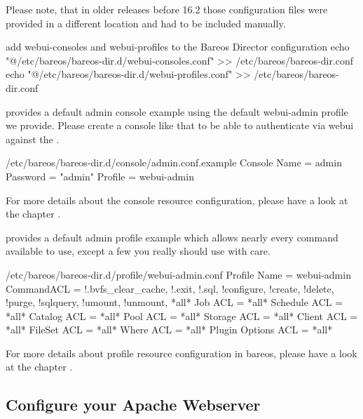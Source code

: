 Please note, that in older releases before 16.2 those configuration files were provided in a different location and had to be included manually.

\begin{commands}{add webui-consoles and webui-profiles to the Bareos Director configuration}
echo "@/etc/bareos/bareos-dir.d/webui-consoles.conf" >> /etc/bareos/bareos-dir.conf
echo "@/etc/bareos/bareos-dir.d/webui-profiles.conf" >> /etc/bareos/bareos-dir.conf
\end{commands}

 provides a default admin console example using the default webui-admin profile we provide. Please create a console like that to be able to authenticate via webui against the \bareosDir.

\begin{bconfig}{/etc/bareos/bareos-dir.d/console/admin.conf.example}
Console {
  Name = admin
  Password = "admin"
  Profile = webui-admin
}
\end{bconfig}

For more details about the console resource configuration, please have a look at the chapter .

 provides a default admin profile example which allows nearly every command available to use, except a few you really should use with care.

\begin{bconfig}{/etc/bareos/bareos-dir.d/profile/webui-admin.conf}
Profile {
  Name = webui-admin
  CommandACL = !.bvfs_clear_cache, !.exit, !.sql, !configure, !create, !delete, !purge, !sqlquery, !umount, !unmount, *all*
  Job ACL = *all*
  Schedule ACL = *all*
  Catalog ACL = *all*
  Pool ACL = *all*
  Storage ACL = *all*
  Client ACL = *all*
  FileSet ACL = *all*
  Where ACL = *all*
  Plugin Options ACL = *all*
}
\end{bconfig}

For more details about profile resource configuration in bareos, please have a look at the chapter .


\subsection{Configure your Apache Webserver}

